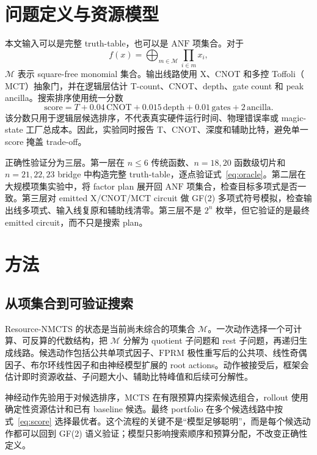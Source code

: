 \documentclass[UTF8,fontset=macnew,11pt]{ctexart}
\newcommand{\method}{Resource-NMCTS}
\newcommand{\anf}{\ensuremath{\mathrm{ANF}}}
\newcommand{\fprm}{\ensuremath{\mathrm{FPRM}}}
\newcommand{\mcts}{\ensuremath{\mathrm{MCTS}}}
\newcommand{\mct}{\ensuremath{\mathrm{MCT}}}
\newcommand{\score}{\ensuremath{\mathrm{score}}}
\newcommand{\ttable}{truth-table}
\begin{document}
\section{问题定义与资源模型}

本文输入可以是完整 \ttable{}，也可以是 \anf{} 项集合。对于
\begin{equation}
  f(x)=\bigoplus_{m\in\mathcal{M}}\prod_{i\in m}x_i ,
  \label{eq:anf}
\end{equation}
$\mathcal{M}$ 表示 square-free monomial 集合。输出线路使用 X、CNOT 和多控 Toffoli（\mct{}）抽象门，并在逻辑层估计 T-count、CNOT、depth、gate count 和 peak ancilla。搜索排序使用统一分数
\begin{equation}
  \score = T + 0.04\,\mathrm{CNOT} + 0.015\,\mathrm{depth}
         + 0.01\,\mathrm{gates} + 2\,\mathrm{ancilla}.
  \label{eq:score}
\end{equation}
该分数只用于逻辑层候选排序，不代表真实硬件运行时间、物理错误率或 magic-state 工厂总成本。因此，实验同时报告 T、CNOT、深度和辅助比特，避免单一 score 掩盖 trade-off。

正确性验证分为三层。第一层在 $n\leq6$ 传统函数、$n=18,20$ 函数级切片和 $n=21,22,23$ bridge 中构造完整 \ttable{}，逐点验证式~\eqref{eq:oracle}。第二层在大规模项集实验中，将 factor plan 展开回 \anf{} 项集合，检查目标多项式是否一致。第三层对 emitted X/CNOT/\mct{} circuit 做 GF(2) 多项式符号模拟，检查输出线多项式、输入线复原和辅助线清零。第三层不是 $2^n$ 枚举，但它验证的是最终 emitted circuit，而不只是搜索 plan。

\section{方法}

\subsection{从项集合到可验证搜索}

\method{} 的状态是当前尚未综合的项集合 $\mathcal{M}$。一次动作选择一个可计算、可反算的代数结构，把 $\mathcal{M}$ 分解为 quotient 子问题和 rest 子问题，再递归生成线路。候选动作包括公共单项式因子、\fprm{} 极性重写后的公共项、线性奇偶因子、布尔环线性因子和由神经模型扩展的 root actions。动作被接受后，框架会估计即时资源收益、子问题大小、辅助比特峰值和后续可分解性。

神经动作先验用于对候选排序，\mcts{} 在有限预算内探索候选组合，rollout 使用确定性资源估计和已有 baseline 候选。最终 portfolio 在多个候选线路中按式~\eqref{eq:score} 选择最优者。这个流程的关键不是“模型足够聪明”，而是每个候选动作都可以回到 GF(2) 语义验证；模型只影响搜索顺序和预算分配，不改变正确性定义。
\end{document}
